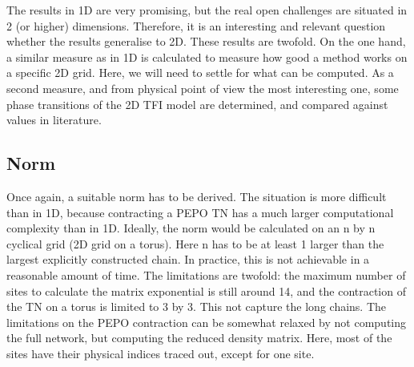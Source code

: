 The results in 1D are very promising, but the real open challenges are situated in 2 (or higher) dimensions. Therefore, it is an interesting and relevant question whether the results generalise to 2D. These results are twofold. On the one hand, a similar measure as in 1D is calculated to measure how good a method works on a specific 2D grid. Here, we will need to settle for what can be computed. As a second measure, and from physical point of view the most interesting one, some phase transitions of the 2D \Gls{TFI} model are determined, and compared against values in literature.

\subsection{Norm}

Once again, a suitable norm has to be derived. The situation is more difficult than in 1D, because contracting a PEPO \Gls{TN} has a much larger computational complexity than in 1D. Ideally, the norm would be calculated on an n by n cyclical grid (2D grid on a torus). Here n has to be at least 1 larger than the largest explicitly constructed chain. In practice, this is not achievable in a reasonable amount of time. The limitations are twofold: the maximum number of sites to calculate the matrix exponential is still around 14, and the contraction of the \Gls{TN} on a torus is limited to 3 by 3. This not capture the long chains.  The limitations on the PEPO contraction can be somewhat relaxed by not computing the full network, but computing the reduced density matrix. Here, most of the sites have their physical indices traced out, except for one site.

